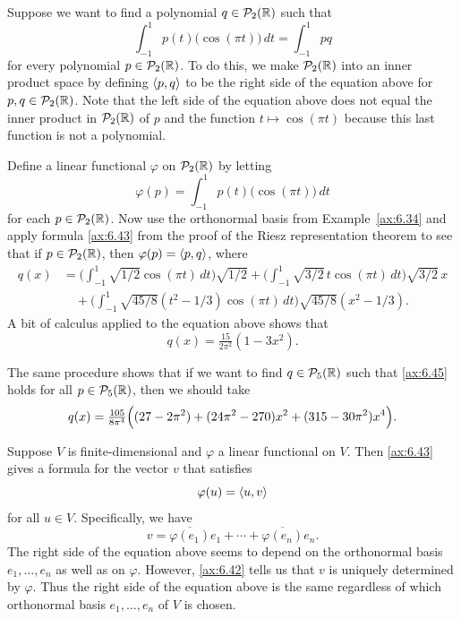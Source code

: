 \begin{example}\label{ax:6.44}
Suppose we want to find a polynomial $q\in\mathcal{P}_2(\mathbb{R})$
such that\label{ax:6.45}
\[ \int_{-1}^{1} p(t)\bigl(\cos(\pi t)\bigr)\,dt = \int_{-1}^{1} pq
   \tag*{\thetheorem} \]
for every polynomial $p\in\mathcal{P}_2(\mathbb{R})$. To do this, we make $\mathcal{P}_2(\mathbb{R})$ into
an inner product space by defining $\langle p, q \rangle$ to be the right side of the
equation above for $p,q\in\mathcal{P}_2(\mathbb{R})$. Note that the left side of the equation
above does not equal the inner product in $\mathcal{P}_2(\mathbb{R})$ of $p$ and the function
$t\mapsto\cos(\pi t)$ because this last function is not a polynomial.

Define a linear functional $\varphi$ on $\mathcal{P}_2(\mathbb{R})$ by letting
\[ \varphi(p) = \int_{-1}^{1} p(t)\bigl(\cos(\pi t)\bigr)\,dt \]
for each $p\in\mathcal{P}_2(\mathbb{R})$. Now use the orthonormal basis from
Example~\ref{ax:6.34} and apply formula \ref{ax:6.43} from the proof of the
Riesz representation theorem to see that if $p\in\mathcal{P}_2(\mathbb{R})$, then
$\varphi(p)=\langle p, q \rangle$, where
\begin{align*}
q(x) &= \biggl(\int_{-1}^{1}\sqrt{1/2}\cos(\pi t)\,dt\biggr)\sqrt{1/2}
        +\biggl(\int_{-1}^{1}\sqrt{3/2}\,t\cos(\pi t)\,dt\biggr)
        \sqrt{3/2}\,x\\
     &\quad+\biggl(\int_{-1}^{1}\sqrt{45/8}(t^2-1/3)
        \cos(\pi t)\,dt\biggr)\sqrt{45/8}(x^2-1/3).
\end{align*}
A bit of calculus applied to the equation above shows that
\[ q(x) = \tfrac{15}{2\pi^2}(1-3x^2). \]

The same procedure shows that if we want to find $q\in\mathcal{P}_5(\mathbb{R})$ such that
\ref{ax:6.45} holds for all $p\in\mathcal{P}_5(\mathbb{R})$, then we should take
\[ q(x) = \tfrac{105}{8\pi^4}\Bigl((27-2\pi^2)+(24\pi^2-270)x^2
          +(315-30\pi^2)x^4\Bigr). \]
\end{example}

Suppose $V$ is finite-dimensional and $\varphi$ a linear functional on $V$. Then
\ref{ax:6.43} gives a formula for the vector $v$ that satisfies
\[ \varphi(u) = \langle u, v \rangle \]
for all $u\in V$. Specifically, we have
\[ v = \overline{\varphi(e_1)}e_1+\cdots+\overline{\varphi(e_n)}e_n. \]
The right side of the equation above seems to depend on the orthonormal basis
$e_1,\dots,e_n$ as well as on $\varphi$. However, \ref{ax:6.42} tells us that
$v$ is uniquely determined by $\varphi$. Thus the right side of the equation
above is the same regardless of which orthonormal basis $e_1,\dots,e_n$ of $V$
is chosen.

